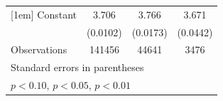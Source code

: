\begin{table}[htbp]
\begin{tabular}{l*{3}{c}}
[1em]
Constant            &       3.706\sym{***}&       3.766\sym{***}&       3.671\sym{***}\\
                    &    (0.0102)         &    (0.0173)         &    (0.0442)         \\
\hline
Observations        &      141456         &       44641         &        3476         \\
\hline\hline
\multicolumn{4}{l}{\footnotesize Standard errors in parentheses}\\
\multicolumn{4}{l}{\footnotesize \sym{*} \(p<0.10\), \sym{**} \(p<0.05\), \sym{***} \(p<0.01\)}\\
\end{tabular}
\end{table}
